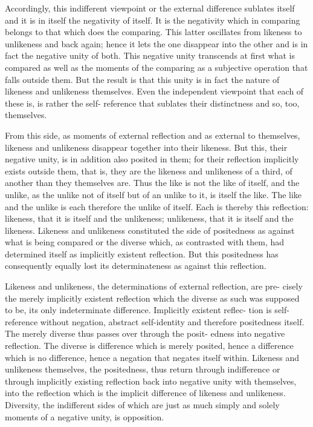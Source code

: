Accordingly, this indifferent viewpoint or the external difference sublates
itself and it is in itself the negativity of itself. It is the negativity which in
comparing belongs to that which does the comparing. This latter oscillates
from likeness to unlikeness and back again; hence it lets the one disappear
into the other and is in fact the negative unity of both. This negative
unity transcends at first what is compared as well as the moments of the
comparing as a subjective operation that falls outside them. But the result
is that this unity is in fact the nature of likeness and unlikeness themselves.
Even the independent viewpoint that each of these is, is rather the self-
reference that sublates their distinctness and so, too, themselves.

From this side, as moments of external reflection and as external to
themselves, likeness and unlikeness disappear together into their likeness.
But this, their negative unity, is in addition also posited in them; for their
reflection implicitly exists outside them, that is, they are the likeness and
unlikeness of a third, of another than they themselves are. Thus the like is
not the like of itself, and the unlike, as the unlike not of itself but of an
unlike to it, is itself the like. The like and the unlike is each therefore the
unlike of itself. Each is thereby this reflection: likeness, that it is itself and
the unlikeness; unlikeness, that it is itself and the likeness.
Likeness and unlikeness constituted the side of positedness as against
what is being compared or the diverse which, as contrasted with them,
had determined itself as implicitly existent reflection. But this positedness
has consequently equally lost its determinateness as against this reflection.

Likeness and unlikeness, the determinations of external reflection, are pre-
cisely the merely implicitly existent reflection which the diverse as such was
supposed to be, its only indeterminate difference. Implicitly existent reflec-
tion is self-reference without negation, abstract self-identity and therefore
positedness itself.  The merely diverse thus passes over through the posit-
edness into negative reflection. The diverse is difference which is merely
posited, hence a difference which is no difference, hence a negation that
negates itself within. Likeness and unlikeness themselves, the positedness,
thus return through indifference or through implicitly existing reflection
back into negative unity with themselves, into the reflection which is the
implicit difference of likeness and unlikeness. Diversity, the indifferent sides
of which are just as much simply and solely moments of a negative unity, is
opposition.

